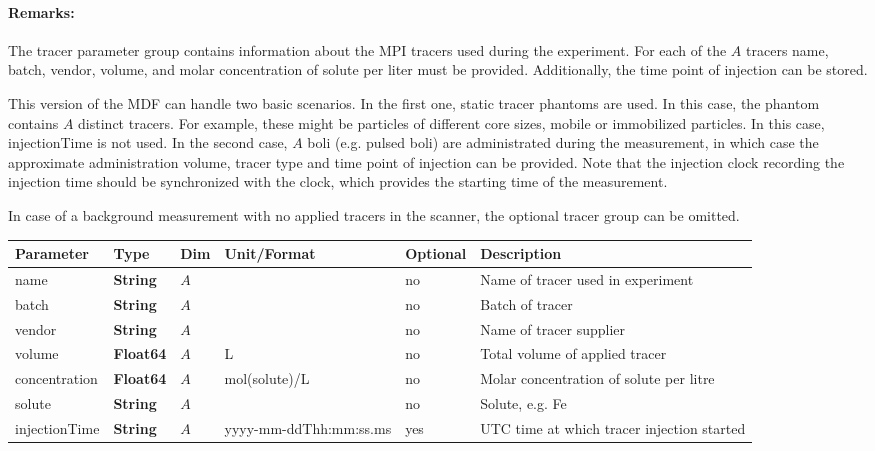\documentclass[landscape,a4paper]{article} %
\newcommand{\inltab}[1]{{\ttfamily\bfseries\color{blue}#1}}
\newcommand{\inlvar}[1]{{\ttfamily#1}}
\begin{document}
\begin{multicols}{2}
\paragraph{Remarks:} The tracer parameter group contains information about the MPI tracers used during the experiment. For each of the $A$ tracers \inlvar{name}, \inlvar{batch}, \inlvar{vendor}, \inlvar{volume},  and molar \inlvar{concentration} of \inlvar{solute} per liter must be provided. Additionally, the time point of injection can be stored.

This version of the MDF can handle two basic scenarios. In the first one, static tracer phantoms are used. In this case, the phantom contains $A$ distinct tracers. For example, these might be particles of different core sizes, mobile or immobilized particles. In this case, \inlvar{injectionTime} is not used. In the second case, $A$ boli (e.g. pulsed boli) are administrated during the measurement, in which case the approximate administration volume, tracer type and time point of injection can be provided. Note that the injection clock recording the injection time should be synchronized with the clock, which provides the starting time of the measurement.

In case of a background measurement with no applied tracers in the scanner, the optional tracer group can be omitted.
\end{multicols}

\noindent \begin{tabularx}{\columnwidth}{lllllX} 
\textbf{Parameter} & \textbf{Type} & \textbf{Dim} & \textbf{Unit/Format} & \textbf{Optional} & \textbf{Description} \\ \hline 
\inlvar{name} & \inltab{String} & $A$ & & no & Name of tracer used in experiment \\ \hline
\inlvar{batch} & \inltab{String} & $A$ & & no & Batch of tracer \\ \hline
\inlvar{vendor} & \inltab{String} & $A$ & & no & Name of tracer supplier \\ \hline
\inlvar{volume} & \inltab{Float64} & $A$ & L & no & Total volume of applied tracer \\ \hline
\inlvar{concentration} & \inltab{Float64} & $A$ & mol(\inlvar{solute})/L & no & Molar concentration of \inlvar{solute} per litre \\ \hline
\inlvar{solute} & \inltab{String} & $A$ & & no & Solute, e.g. Fe \\ \hline
\inlvar{injectionTime} & \inltab{String} & $A$ & yyyy-mm-ddThh:mm:ss.ms & yes & UTC time at which tracer injection started \\ \hline
\end{tabularx}
\end{document}
